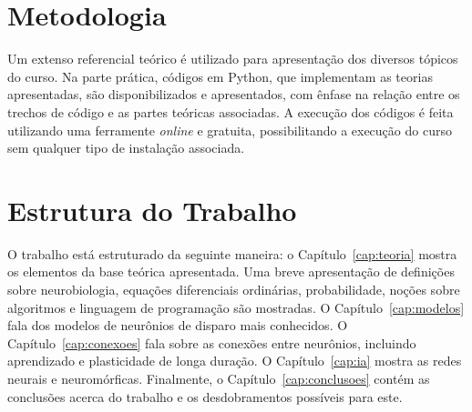 \section{Metodologia}
Um extenso referencial teórico é utilizado para apresentação dos diversos tópicos do curso. Na parte prática, códigos em Python, que implementam as teorias apresentadas, são disponibilizados e apresentados, com ênfase na relação entre os trechos de código e as partes teóricas associadas. A execução dos códigos é feita utilizando uma ferramente \textit{online} e gratuita, possibilitando a execução do curso sem qualquer tipo de instalação associada.

\section{Estrutura do Trabalho}
O trabalho está estruturado da seguinte maneira: o Capítulo~\ref{cap:teoria} mostra os elementos da base teórica apresentada. Uma breve apresentação de definições sobre neurobiologia, equações diferenciais ordinárias, probabilidade, noções sobre algoritmos e linguagem de programação são mostradas. O Capítulo~\ref{cap:modelos} fala dos modelos de neurônios de disparo mais conhecidos. O Capítulo~\ref{cap:conexoes} fala sobre as conexões entre neurônios, incluindo aprendizado e plasticidade de longa duração. O Capítulo~\ref{cap:ia} mostra as redes neurais e neuromórficas. Finalmente, o Capítulo~\ref{cap:conclusoes} contém as conclusões acerca do trabalho e os desdobramentos possíveis para este.
